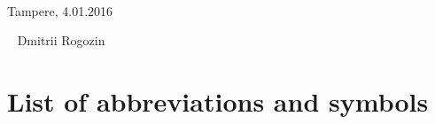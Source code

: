 \documentclass[12pt,a4paper,english%
]{tutthesis}
\begin{document}
~ 

Tampere, 4.01.2016

~
Dmitrii Rogozin
%
%

\renewcommand\contentsname{Table of Contents} %
\setcounter{tocdepth}{3}                      %
\tableofcontents                              %

\renewcommand\listfigurename{List of Figures}  %
\listoffigures                                 %
\markboth{}{}                                  %

\renewcommand\listtablename{List of Tables}    %
\listoftables                                  %
\markboth{}{}                                  %




%
%

\chapter*{List of abbreviations and symbols}
\markboth{}{}                                %
\end{document}
